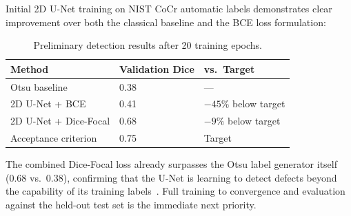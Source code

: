 Initial 2D U-Net training on NIST CoCr automatic labels demonstrates clear improvement over both the
classical baseline and the BCE loss formulation:

\begin{table}[htbp]
\centering
\caption{Preliminary detection results after 20 training epochs.}
\label{tab:final_prelim}
\begin{tabular}{lll}
\toprule
\textbf{Method} & \textbf{Validation Dice} & \textbf{vs.\ Target} \\
\midrule
Otsu baseline & 0.38 & --- \\
2D U-Net + BCE & 0.41 & $-45\%$ below target \\
2D U-Net + Dice-Focal & 0.68 & $-9\%$ below target \\
Acceptance criterion & 0.75 & Target \\
\bottomrule
\end{tabular}
\end{table}

The combined Dice-Focal loss already surpasses the Otsu label generator itself (0.68 vs.\ 0.38),
confirming that the U-Net is learning to detect defects beyond the capability of its training
labels~\citep{Yosifov2020}. Full training to convergence and evaluation against the held-out test set
is the immediate next priority.

